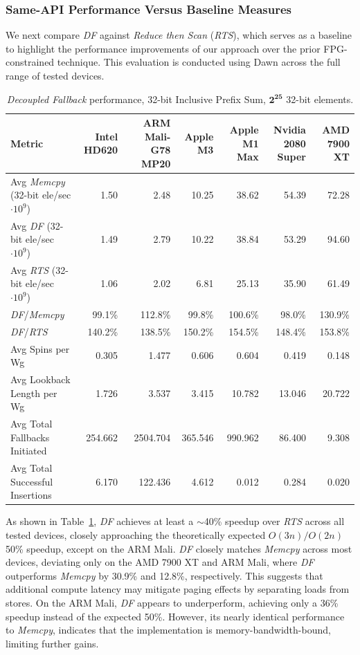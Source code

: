 \documentclass[sigconf]{acmart}
\begin{document}
\subsubsection{Same-API Performance Versus Baseline Measures}
We next compare \emph{DF} against \emph{Reduce then Scan}\textdagger{~\ref{sec:rts}} (\emph{RTS}), which serves as a baseline to highlight the performance improvements of our approach over the prior FPG-constrained technique. This evaluation is conducted using Dawn across the full range of tested devices.

\begin{table}
  \centering
  \setlength{\tabcolsep}{1pt}
  \begin{tabular*}{\textwidth}{@{\extracolsep{\fill}} l r r r r r r}
    \toprule
    Metric & Intel HD620 & ARM Mali-G78 MP20 & Apple M3 & Apple M1 Max & Nvidia 2080 Super & AMD 7900 XT \\
    \midrule
    Avg \emph{Memcpy} (32-bit ele/sec $\cdot 10^9$)  & 1.50   & 2.48  & 10.25  & 38.62  & 54.39  & 72.28  \\
    Avg \emph{DF} (32-bit ele/sec $\cdot 10^9$)   & 1.49   & 2.79  & 10.22  & 38.84  & 53.29  & 94.60  \\
    Avg \emph{RTS} (32-bit ele/sec $\cdot 10^9$)      & 1.06   & 2.02  & 6.81   & 25.13  & 35.90  & 61.49  \\
    \emph{DF}/\emph{Memcpy}       & 99.1\%    & 112.8\%  & 99.8\%    & 100.6\%   & 98.0\%    & 130.9\%   \\
    \emph{DF}/\emph{RTS}          & 140.2\%   & 138.5\%  & 150.2\%   & 154.5\%   & 148.4\%   & 153.8\%   \\
    Avg Spins per Wg    & 0.305    & 1.477    & 0.606    & 0.604    & 0.419    & 0.148    \\
    Avg Lookback Length per Wg  & 1.726    & 3.537    & 3.415    & 10.782   & 13.046   & 20.722   \\
    Avg Total Fallbacks Initiated      & 254.662   & 2504.704  & 365.546   & 990.962   & 86.400   & 9.308   \\
    Avg Total Successful Insertions    & 6.170     & 122.436   & 4.612     & 0.012    & 0.284    & 0.020    \\
    \bottomrule
  \end{tabular*}
  \caption{\emph{Decoupled Fallback} performance, 32-bit Inclusive Prefix Sum, $\mathbf{2^{25}}$ 32-bit elements.\label{tab:results}}
\end{table}

As shown in Table~\ref{tab:results}, \emph{DF} achieves at least a $\sim$40\% speedup over \emph{RTS} across all tested devices, closely approaching the theoretically expected $O(3n)/O(2n)$ 50\% speedup, except on the ARM Mali. \emph{DF} closely matches \emph{Memcpy} across most devices, deviating only on the AMD 7900 XT and ARM Mali, where \emph{DF} outperforms \emph{Memcpy} by 30.9\% and 12.8\%, respectively. This suggests that additional compute latency may mitigate paging effects by separating loads from stores. On the ARM Mali, \emph{DF} appears to underperform, achieving only a 36\% speedup instead of the expected 50\%. However, its nearly identical performance to \emph{Memcpy}, indicates that the implementation is memory-bandwidth-bound, limiting further gains.
\end{document}
